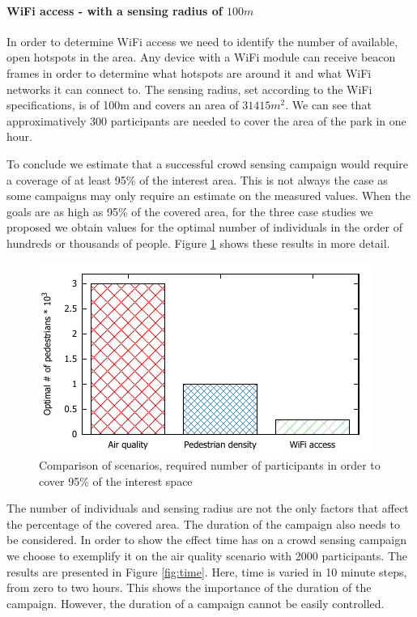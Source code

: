 \paragraph{WiFi access - with a sensing radius of $100m$}
In order to determine WiFi access we need to identify the number of available, open hotspots in the area. Any device with a WiFi module can receive beacon frames in order to determine what hotspots are around it and what WiFi networks it can connect to. The sensing radius, set according to the WiFi specifications, is of 100m and covers an area of $31415m^2$. We can see that approximatively 300 participants are needed to cover the area of the park in one hour.

To conclude we estimate that a successful crowd sensing campaign would require a coverage of at least 95\% of the interest area. This is not always the case as some campaigns may only require an estimate on the measured values. When the goals are as high as 95\% of the covered area, for the three case studies we proposed we obtain values for the optimal number of individuals in the order of hundreds or thousands of people. Figure \ref{fig:comparison} shows these results in more detail.

\begin{figure}
    \centering
    \includegraphics{src/gnuplot/comp.pdf}
    \caption{Comparison of scenarios, required number of participants in order to cover 95\% of the interest space}
    \label{fig:comparison}
\end{figure}

The number of individuals and sensing radius are not the only factors that affect the percentage of the covered area. The duration of the campaign also needs to be considered. In order to show the effect time has on a crowd sensing campaign we choose to exemplify it on the air quality scenario with 2000 participants. The results are presented in Figure \ref{fig:time}. Here, time is varied in 10 minute steps, from zero to two hours. This shows the importance of the duration of the campaign. However, the duration of a campaign cannot be easily controlled.


